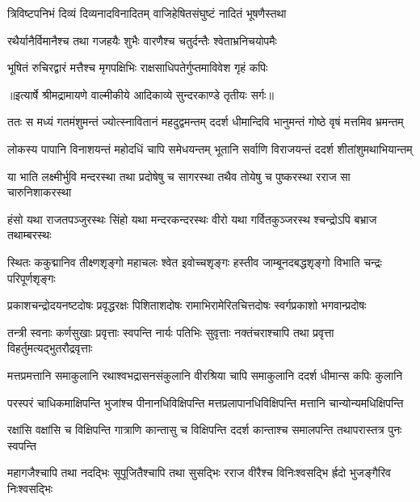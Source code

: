 \twolineshloka
{त्रिविष्टपनिभं दिव्यं दिव्यनादविनादितम्}
{वाजिहेषितसंघुष्टं नादितं भूषणैस्तथा} %

\twolineshloka
{रथैर्यानैर्विमानैश्च तथा गजहयैः शुभैः}
{वारणैश्च चतुर्दन्तैः श्वेताभ्रनिचयोपमैः} %

\twolineshloka
{भूषितं रुचिरद्वारं मत्तैश्च मृगपक्षिभिः}
{राक्षसाधिपतेर्गुप्तमाविवेश गृहं कपिः} %


{॥इत्यार्षे श्रीमद्रामायणे वाल्मीकीये आदिकाव्ये सुन्दरकाण्डे तृतीयः सर्गः॥}


\fourlineindentedshloka
{ततः स मध्यं गतमंशुमन्तं}
{ ज्योत्स्नावितानं महदुद्वमन्तम्}
{ददर्श धीमान्दिवि भानुमन्तं}
{ गोष्ठे वृषं मत्तमिव भ्रमन्तम्} %

\fourlineindentedshloka
{लोकस्य पापानि विनाशयन्तं}
{ महोदधिं चापि समेधयन्तम्}
{भूतानि सर्वाणि विराजयन्तं}
{ ददर्श शीतांशुमथाभियान्तम्} %

\fourlineindentedshloka
{या भाति लक्ष्मीर्भुवि मन्दरस्था}
{ तथा प्रदोषेषु च सागरस्था}
{तथैव तोयेषु च पुष्करस्था}
{ रराज सा चारुनिशाकरस्था} %

\fourlineindentedshloka
{हंसो यथा राजतपञ्जुरस्थः}
{ सिंहो यथा मन्दरकन्दरस्थः}
{वीरो यथा गर्वितकुञ्जरस्थ}
{श्चन्द्रोऽपि बभ्राज तथाम्बरस्थः} %

\fourlineindentedshloka
{स्थितः ककुद्मानिव तीक्ष्णशृङ्गो}
{ महाचलः श्वेत इवोच्चशृङ्गः}
{हस्तीव जाम्बूनदबद्धशृङ्गो}
{ विभाति चन्द्रः परिपूर्णशृङ्गः} %

\fourlineindentedshloka
{प्रकाशचन्द्रोदयनष्टदोषः}
{ प्रवृद्धरक्षः पिशिताशदोषः}
{रामाभिरामेरितचित्तदोषः}
{ स्वर्गप्रकाशो भगवान्प्रदोषः} %

\fourlineindentedshloka
{तन्त्री स्वनाः कर्णसुखाः प्रवृत्ताः}
{ स्वपन्ति नार्यः पतिभिः सुवृत्ताः}
{नक्तंचराश्चापि तथा प्रवृत्ता}
{ विहर्तुमत्यद्भुतरौद्रवृत्ताः} %

\fourlineindentedshloka
{मत्तप्रमत्तानि समाकुलानि}
{ रथाश्वभद्रासनसंकुलानि}
{वीरश्रिया चापि समाकुलानि}
{ ददर्श धीमान्स कपिः कुलानि} %

\fourlineindentedshloka
{परस्परं चाधिकमाक्षिपन्ति}
{ भुजांश्च पीनानधिविक्षिपन्ति}
{मत्तप्रलापानधिविक्षिपन्ति}
{ मत्तानि चान्योन्यमधिक्षिपन्ति} %

\fourlineindentedshloka
{रक्षांसि वक्षांसि च विक्षिपन्ति}
{ गात्राणि कान्तासु च विक्षिपन्ति}
{ददर्श कान्ताश्च समालपन्ति}
{ तथापरास्तत्र पुनः स्वपन्ति} %

\fourlineindentedshloka
{महागजैश्चापि तथा नदद्भिः}
{ सूपूजितैश्चापि तथा सुसद्भिः}
{रराज वीरैश्च विनिःश्वसद्भि}
{र्ह्रदो भुजङ्गैरिव निःश्वसद्भिः} %

